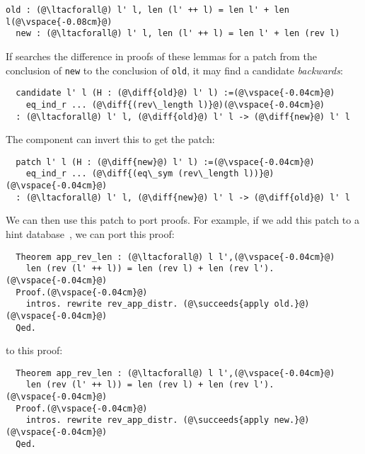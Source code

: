 \begin{lstlisting}[language=coq]
  old : (@\ltacforall@) l' l, len (l' ++ l) = len l' + len l(@\vspace{-0.08cm}@)
  new : (@\ltacforall@) l' l, len (l' ++ l) = len l' + len (rev l)
\end{lstlisting} 

If \sysname searches the difference in proofs of these lemmas for a patch from the 
conclusion of \lstinline{new} to the conclusion of \lstinline{old},
it may find a candidate \emph{backwards}:

\begin{lstlisting}
  candidate l' l (H : (@\diff{old}@) l' l) :=(@\vspace{-0.04cm}@)
    eq_ind_r ... (@\diff{(rev\_length l)}@)(@\vspace{-0.04cm}@)
  : (@\ltacforall@) l' l, (@\diff{old}@) l' l -> (@\diff{new}@) l' l
\end{lstlisting}
The component can invert this to get the patch: %

\begin{lstlisting}
  patch l' l (H : (@\diff{new}@) l' l) :=(@\vspace{-0.04cm}@)
    eq_ind_r ... (@\diff{(eq\_sym (rev\_length l))}@)(@\vspace{-0.04cm}@)
  : (@\ltacforall@) l' l, (@\diff{new}@) l' l -> (@\diff{old}@) l' l
\end{lstlisting}
We can then use this patch to port proofs.
For example, if we add this patch to a hint database~\cite{hints},
we can port this proof:

\begin{lstlisting}
  Theorem app_rev_len : (@\ltacforall@) l l',(@\vspace{-0.04cm}@)
    len (rev (l' ++ l)) = len (rev l) + len (rev l').(@\vspace{-0.04cm}@)
  Proof.(@\vspace{-0.04cm}@)
    intros. rewrite rev_app_distr. (@\succeeds{apply old.}@)(@\vspace{-0.04cm}@)
  Qed.
\end{lstlisting}
to this proof:

\begin{lstlisting}
  Theorem app_rev_len : (@\ltacforall@) l l',(@\vspace{-0.04cm}@)
    len (rev (l' ++ l)) = len (rev l) + len (rev l').(@\vspace{-0.04cm}@)
  Proof.(@\vspace{-0.04cm}@)
    intros. rewrite rev_app_distr. (@\succeeds{apply new.}@)(@\vspace{-0.04cm}@)
  Qed.
\end{lstlisting}

